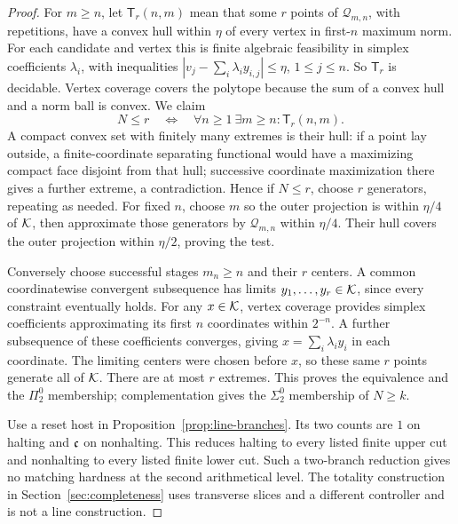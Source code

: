 \begin{proof}
For $m\ge n$, let $\mathsf T_r(n,m)$ mean that some $r$ points of
$\mathcal Q_{m,n}$, with repetitions, have a convex hull within
$\eta$ of every vertex in first-$n$ maximum norm. For each candidate
and vertex this is finite algebraic feasibility in simplex
coefficients $\lambda_i$, with inequalities
$|v_j-\sum_i\lambda_i y_{i,j}|\le\eta$, $1\le j\le n$.
So $\mathsf T_r$ is decidable. Vertex coverage covers the polytope
because the sum of a convex hull and a norm ball is convex.
We claim
\[
 N\le r\quad\Longleftrightarrow\quad
 \forall n\ge1\ \exists m\ge n:\mathsf T_r(n,m).
\]
A compact convex set with finitely many extremes is their hull:
if a point lay outside, a finite-coordinate separating functional
would have a maximizing compact face disjoint from that hull;
successive coordinate maximization there gives a further extreme,
a contradiction. Hence if $N\le r$, choose $r$ generators, repeating
as needed. For fixed $n$, choose $m$ so the outer projection is within
$\eta/4$ of $\mathcal K$, then approximate those generators by
$\mathcal Q_{m,n}$ within $\eta/4$. Their hull covers the outer
projection within $\eta/2$, proving the test.

Conversely choose successful stages $m_n\ge n$ and their $r$ centers.
A common coordinatewise convergent subsequence has limits
$y_1,\ldots,y_r\in\mathcal K$, since every constraint eventually holds.
For any $x\in\mathcal K$, vertex coverage provides simplex coefficients
approximating its first $n$ coordinates within $2^{-n}$. A further
subsequence of these coefficients converges, giving
$x=\sum_i\lambda_i y_i$ in each coordinate. The limiting centers
were chosen before $x$, so these same $r$ points generate all of
$\mathcal K$. There are at most $r$ extremes. This proves the equivalence
and the $\Pi^0_2$ membership; complementation gives the $\Sigma^0_2$
membership of $N\ge k$.

Use a reset host in Proposition~\ref{prop:line-branches}. Its two
counts are $1$ on halting and $\mathfrak c$ on nonhalting. This reduces
halting to every listed finite upper cut and nonhalting to every
listed finite lower cut. Such a two-branch reduction gives no
matching hardness at the second arithmetical level. The totality
construction in Section~\ref{sec:completeness} uses transverse
slices and a different controller and is not a line construction.
\end{proof}
